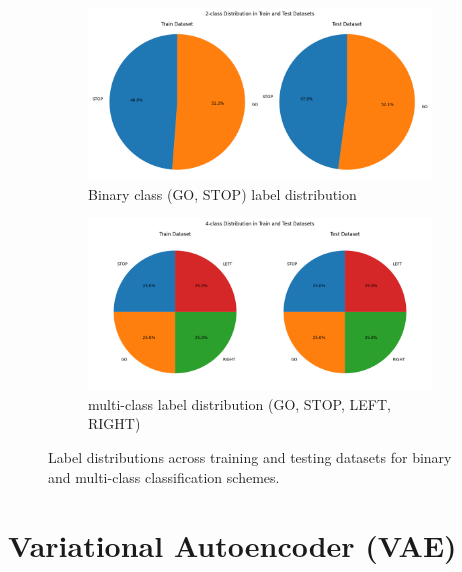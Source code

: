 \begin{figure}[htbp]
    \centering
    \begin{subfigure}{0.48\textwidth}
        \centering
        \includegraphics[width=\linewidth]{img/dataset/2class_distribution.png}
        \caption{Binary class (GO, STOP) label distribution}
        \label{fig:binary_class_distribution}
    \end{subfigure}
    \hfill
    \begin{subfigure}{0.5\textwidth}
        \centering
        \includegraphics[width=\linewidth]{img/dataset/4class_distribution.png}
        \caption{multi-class label distribution (GO, STOP, LEFT, RIGHT)}
        \label{fig:class_distribution_pie}
    \end{subfigure}
    \caption{Label distributions across training and testing datasets for binary and multi-class classification schemes.}
    \label{fig:label_distribution_combined}
\end{figure}





\section{Variational Autoencoder (VAE)} \label{sec:vae}

